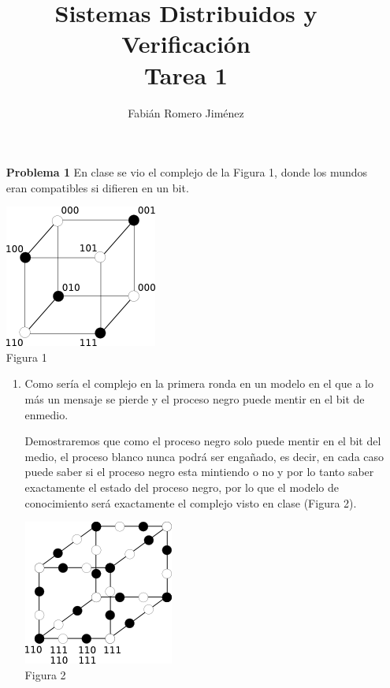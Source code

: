 \documentclass{article}
\title{Sistemas Distribuidos y Verificación \\ Tarea 1}
\author{Fabián Romero Jiménez}
\date{}
\begin{document}
\maketitle

\begin{enumerate}

\item[\bf{Problema 1}] En clase se vio el complejo de la Figura 1, donde los mundos eran compatibles si difieren en un bit.\\

\begin{center}
  \includegraphics{cubo1.png}\\
  Figura 1
\end{center}

\begin{enumerate}

\item Como sería el complejo en la primera ronda en un modelo en el que a lo más un mensaje se pierde y el proceso negro puede mentir en el bit de enmedio.

Demostraremos que como el proceso negro solo puede mentir en el bit del medio, el proceso blanco nunca podrá ser engañado, es decir, en cada caso puede saber si el proceso negro esta mintiendo o no y por lo tanto saber exactamente el estado del proceso negro, por lo que el modelo de conocimiento será exactamente el complejo visto en clase (Figura 2).\\

\begin{center}
  \includegraphics{cubo2.png}\\
  Figura 2
\end{center}


\end{enumerate}
\end{enumerate}
\end{document}
